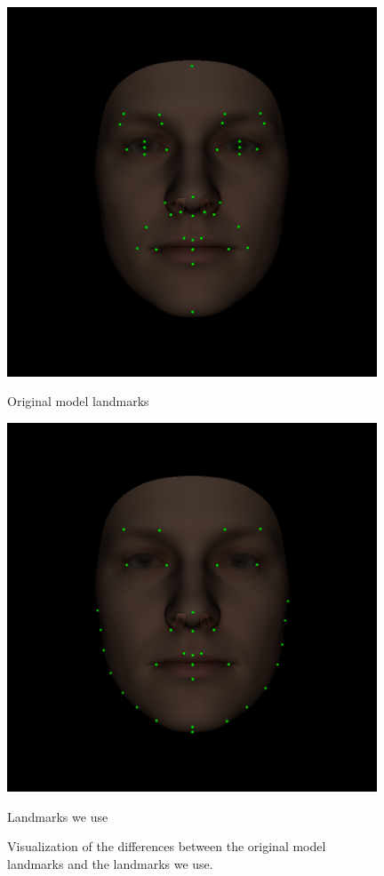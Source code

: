 \begin{figure}
  \centering
  \begin{minipage}{.49\textwidth}
    \centering
    \includegraphics[width=0.98\textwidth]{Figures/Pictures/origGreen.png}
    \caption*{Original model landmarks}
  \end{minipage}
  \begin{minipage}{.49\textwidth}
    \centering
    \includegraphics[width=0.98\textwidth]{Figures/Pictures/pipelineGreen.png}
    \caption*{Landmarks we use}
  \end{minipage}
  \caption{Visualization of the differences between the original model landmarks and the landmarks we use.}
  \label{f3.9}
\end{figure}

